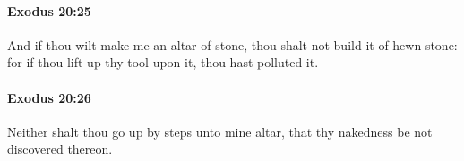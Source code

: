 		\paragraph{Exodus 20:25} %
			\label{EXODUS-20-25}

			And if thou wilt make me an altar of stone, thou shalt not build it of hewn stone: for if thou lift up thy tool upon it, thou hast polluted it.


		\paragraph{Exodus 20:26} %
			\label{EXODUS-20-26}

			Neither shalt thou go up by steps unto mine altar, that thy nakedness be not discovered thereon.

